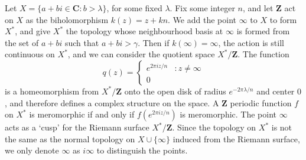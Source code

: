 \begin{example}
    Let $X = \{ a + bi \in \mathbf{C}: b > \lambda \}$, for some fixed $\lambda$. Fix some integer $n$, and let $\mathbf{Z}$ act on $X$ as the biholomorphism $k(z) = z + kn$. We add the point $\infty$ to $X$ to form $X^*$, and give $X^*$ the topology whose neighbourhood basis at $\infty$ is formed from the set of $a + bi$ such that $a + bi > \gamma$. Then if $k(\infty) = \infty$, the action is still continuous on $X^*$, and we can consider the quotient space $X^*/\mathbf{Z}$. The function
    \[ q(z) = \begin{cases} e^{2 \pi i z/n} &: z \neq \infty \\ 0 \end{cases} \]
    is a homeomorphism from $X^*/\mathbf{Z}$ onto the open disk of radius $e^{-2 \pi \lambda/n}$ and center $0$, and therefore defines a complex structure on the space. A $\mathbf{Z}$ periodic function $f$ on $X^*$ is meromorphic if and only if $f(e^{2 \pi i z/n})$ is meromorphic. The point $\infty$ acts as a `cusp' for the Riemann surface $X^*/\mathbf{Z}$. Since the topology on $X^*$ is not the same as the normal topology on $X \cup \{ \infty \}$ induced from the Riemann surface, we only denote $\infty$ as $i\infty$ to distinguish the points.
\end{example}

